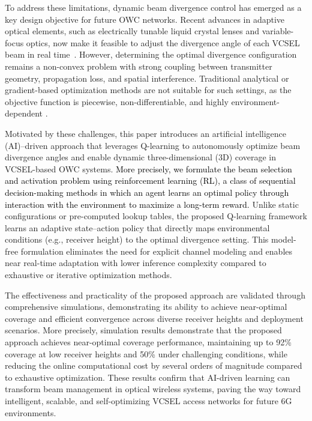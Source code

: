 \documentclass[twocolumn,twoside]{IEEEtran}
\theoremstyle{break}
\begin{document}
To address these limitations, dynamic beam divergence control has emerged as a key design objective for future OWC networks. Recent advances in adaptive optical elements, such as electrically tunable liquid crystal lenses and variable-focus optics, now make it feasible to adjust the divergence angle of each VCSEL beam in real time~\cite{vlenses,vlenses2}. However, determining the optimal divergence configuration remains a non-convex problem with strong coupling between transmitter geometry, propagation loss, and spatial interference. Traditional analytical or gradient-based optimization methods are not suitable for such settings, as the objective function is piecewise, non-differentiable, and highly environment-dependent \cite{safi3d}. 

Motivated by these challenges, this paper introduces an artificial intelligence (AI)–driven approach that leverages Q-learning to autonomously optimize beam divergence angles and enable dynamic three-dimensional (3D) coverage in VCSEL-based OWC systems. \textcolor{black}{More precisely, we formulate the beam selection and activation problem using reinforcement learning (RL), a class of sequential decision-making methods in which an agent learns an optimal policy through interaction with the environment to maximize a long-term reward.} Unlike static configurations or pre-computed lookup tables, the proposed Q-learning framework learns an adaptive state–action policy that directly maps environmental conditions (e.g., receiver height) to the optimal divergence setting. This model-free formulation eliminates the need for explicit channel modeling and enables near real-time adaptation with lower inference complexity compared to exhaustive or iterative optimization methods.

The effectiveness and practicality of the proposed approach are validated through comprehensive simulations, demonstrating its ability to achieve near-optimal coverage and efficient convergence across diverse receiver heights and deployment scenarios. More precisely, simulation results demonstrate that the proposed approach achieves near-optimal coverage performance, maintaining up to 92\% coverage at low receiver heights and 50\% under challenging conditions, while reducing the online computational cost by several orders of magnitude compared to exhaustive optimization. These results confirm that AI-driven learning can transform beam management in optical wireless systems, paving the way toward intelligent, scalable, and self-optimizing VCSEL access networks for future 6G environments.
\end{document}
